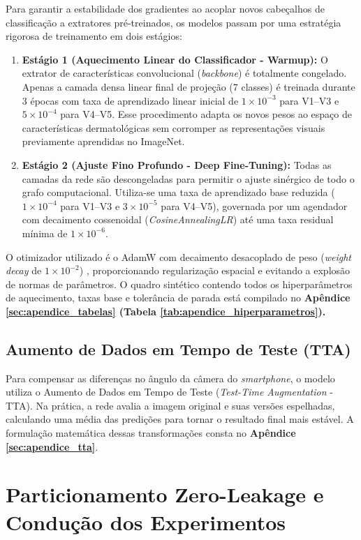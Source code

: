 \documentclass[oneside,english,brazilian]{UNISINOSmonografia}
\begin{document}
Para garantir a estabilidade dos gradientes ao acoplar novos cabeçalhos de classificação a extratores pré-treinados, os modelos passam por uma estratégia rigorosa de treinamento em dois estágios:

\begin{enumerate}
    \item \textbf{Estágio 1 (Aquecimento Linear do Classificador - Warmup):} O extrator de características convolucional (\textit{backbone}) é totalmente congelado. Apenas a camada densa linear final de projeção (7 classes) é treinada durante 3 épocas com taxa de aprendizado linear inicial de $1 \times 10^{-3}$ para V1--V3 e $5 \times 10^{-4}$ para V4--V5. Esse procedimento adapta os novos pesos ao espaço de características dermatológicas sem corromper as representações visuais previamente aprendidas no ImageNet.
    \item \textbf{Estágio 2 (Ajuste Fino Profundo - Deep Fine-Tuning):} Todas as camadas da rede são descongeladas para permitir o ajuste sinérgico de todo o grafo computacional. Utiliza-se uma taxa de aprendizado base reduzida ($1 \times 10^{-4}$ para V1--V3 e $3 \times 10^{-5}$ para V4--V5), governada por um agendador com decaimento cossenoidal (\textit{CosineAnnealingLR}) até uma taxa residual mínima de $1 \times 10^{-6}$.
\end{enumerate}

O otimizador utilizado é o AdamW com decaimento desacoplado de peso (\textit{weight decay} de $1 \times 10^{-2}$) \cite{loshchilov2017decoupled}, proporcionando regularização espacial e evitando a explosão de normas de parâmetros. O quadro sintético contendo todos os hiperparâmetros de aquecimento, taxas base e tolerância de parada está compilado no \textbf{Apêndice \ref{sec:apendice_tabelas} (Tabela \ref{tab:apendice_hiperparametros}).}

\subsection{Aumento de Dados em Tempo de Teste (TTA)}
Para compensar as diferenças no ângulo da câmera do \textit{smartphone}, o modelo utiliza o Aumento de Dados em Tempo de Teste (\textit{Test-Time Augmentation} - TTA). Na prática, a rede avalia a imagem original e suas versões espelhadas, calculando uma média das predições para tornar o resultado final mais estável. A formulação matemática dessas transformações consta no \textbf{Apêndice \ref{sec:apendice_tta}}.

\section{Particionamento Zero-Leakage e Condução dos Experimentos}
\end{document}
